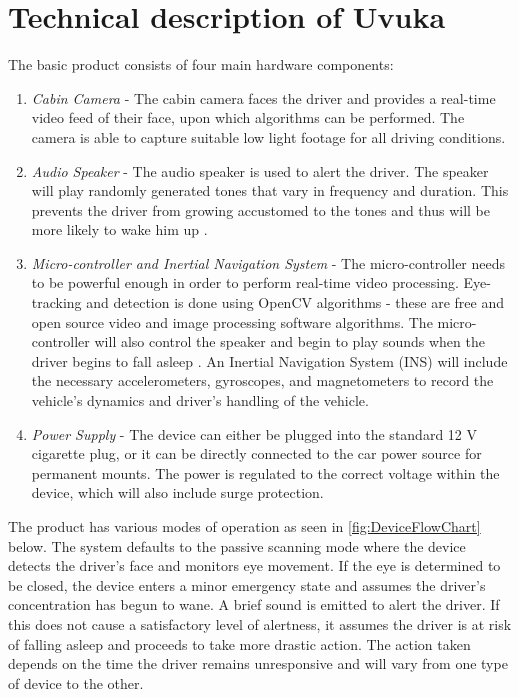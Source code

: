 \section{Technical description of Uvuka}
\label{sec:Technical description of Uvuka}
The basic product consists of four main hardware components:
\begin{enumerate}
  \item \textit{Cabin Camera} - The cabin camera faces the driver and provides a real-time video feed of their face, upon which algorithms can be performed. The camera is able to capture suitable low light footage for all driving conditions.
  \item \textit{Audio Speaker} - The audio speaker is used to alert the driver. The speaker will play randomly generated tones that vary in frequency and duration. This prevents the driver from growing accustomed to the tones and thus will be more likely to wake him up \cite{Habituation}.
  \item \textit{Micro-controller and Inertial Navigation System} - The micro-controller needs to be powerful enough in order to perform real-time video processing. Eye-tracking and detection is done using OpenCV algorithms - these are free and open source video and image processing software algorithms. The micro-controller will also control the speaker and begin to play sounds when the driver begins to fall asleep \cite{OpenCV}. An Inertial Navigation System (INS) will include the necessary accelerometers, gyroscopes, and magnetometers to record the vehicle's dynamics and driver's handling of the vehicle.
  \item \textit{Power Supply} - The device can either be plugged into the standard 12 V cigarette plug, or it can be directly connected to the car power source for permanent mounts. The power is regulated to the correct voltage within the device, which will also include surge protection.
\end{enumerate}

The product has various modes of operation as seen in \cref{fig:DeviceFlowChart} below. The system defaults to the passive scanning mode where the device detects the driver's face and monitors eye movement. If the eye is determined to be closed, the device  enters a minor emergency state and assumes the driver's concentration has begun to wane. A brief sound is emitted to alert the driver. If this does not cause a satisfactory level of alertness, it assumes the driver is at risk of falling asleep and proceeds to take more drastic action. The action taken depends on the time the driver remains unresponsive and will vary from one type of device to the other.

